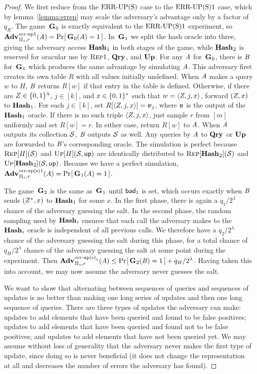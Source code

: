\begin{proof} We first reduce from the $\textnormal{ERR\mbox{-}UP(S)}$ case to the $\textnormal{ERR\mbox{-}UP(S)}1$ case, which by lemma~\ref{lemma:errep} may scale the adversary's advantage only by a factor of $q_R$. The game~$\mathbf{G}\hspace{0.5pt}_0$ is exactly equivalent to the $\textnormal{ERR\mbox{-}UP(S)}1$ experiment, so $\Adv{\errep1}_{\struct_s,r}(\advA) = \Prob{\G_0(\advA) = 1}$. In~$\mathbf{G}\hspace{0.5pt}_1$ we split the hash oracle into three, giving the adversary access $\mathbf{Hash}\hspace{0.5pt}_1$ in both stages of the game, while $\mathbf{Hash}\hspace{0.5pt}_2$ is reserved for oracular use by $\textsc{Rep}1$, $\mathbf{Qry}\hspace{0.5pt}$, and $\mathbf{Up}\hspace{0.5pt}$. For any $\mathit{A}$ for~$\mathbf{G}\hspace{0.5pt}_0$, there is $\mathit{B}$ for~$\mathbf{G}\hspace{0.5pt}_1$ which produces the same advantage by simulating $\mathit{A}$. This adversary first creates its own table $R$ with all values initially undefined. When $\mathit{A}$ makes a query $w$ to $H$, $\mathit{B}$ returns $R[w]$ if that entry in the table is defined. Otherwise, if there are $Z \in \{0,1\}^\lambda$, $j \in [k]$, and $x \in \{0,1\}^*$ such that $w = \langle Z, j, x\rangle$, forward $(Z,x)$ to $\mathbf{Hash}\hspace{0.5pt}_1$. For each $j \in [k]$, set $R[\langle\salt, j, x\rangle] = \vv_j$, where $\vv$ is the output of the $\mathbf{Hash}\hspace{0.5pt}_1$ oracle. If there is no such triple $\langle Z, j, x\rangle$, just sample $r$ from $[m]$ uniformly and set $R[w] = r$. In either case, return $R[w]$ to $\mathit{A}$. When $\mathit{A}$ outputs its collection $\mathcal{S}$, $\mathit{B}$ outputs $\mathcal{S}$ as well. Any queries by $\mathit{A}$ to $\mathbf{Qry}\hspace{0.5pt}$ or $\mathbf{Up}\hspace{0.5pt}$ are forwarded to $\mathit{B}$'s corresponding oracle. The simulation is perfect because $\textsc{Rep}[H](\mathcal{S})$ and $\textsc{Up}[H](\mathcal{S},\mathsf{up})$ are identically distributed to $\textsc{Rep}[\mathbf{Hash}\hspace{0.5pt}_2](\mathcal{S})$ and $\textsc{Up}[\mathbf{Hash}\hspace{0.5pt}_2](\mathcal{S},\mathsf{up})$. Because we have a perfect simulation, $\Adv{\erreps1}_{\struct_s,r}(\advA) = \Prob{\G_1(\advA) = 1}$.

The game~$\mathbf{G}\hspace{0.5pt}_2$ is the same as~$\mathbf{G}\hspace{0.5pt}_1$ until $\mathsf{bad}_1$ is set, which occurs exactly when $\mathit{B}$ sends $(Z^*,x)$ to $\mathbf{Hash}\hspace{0.5pt}_1$ for some $x$. In the first phase, there is again a $q_1/2^\lambda$ chance of the adversary guessing the salt. In the second phase, the random sampling used by $\mathbf{Hash}\hspace{0.5pt}_i$ ensures that each call the adversary makes to the $\mathbf{Hash}\hspace{0.5pt}_i$ oracle is independent of all previous calls. We therefore have a $q_2/2^\lambda$ chance of the adversary guessing the salt during this phase, for a total chance of $q_H/2^\lambda$ chance of the adversary guessing the salt at some point during the experiment. Then $\Adv{\erreps_1}_{\struct_s,r}(\advA) \le \Prob{\G_2(\advB) = 1} + q_H/2^\lambda$. Having taken this into account, we may now assume the adversary never guesses the salt.

We want to show that alternating between sequences of queries and sequences of updates is no better than making one long series of updates and then one long sequence of queries. There are three types of updates the adversary can make: updates to add elements that have been queried and found to be false positives; updates to add elements that have been queried and found not to be false positives; and updates to add elements that have not been queried yet. We may assume without loss of generality that the adversary never makes the first type of update, since doing so is never beneficial (it does not change the representation at all and decreases the number of errors the adversary has found).


\end{proof}
